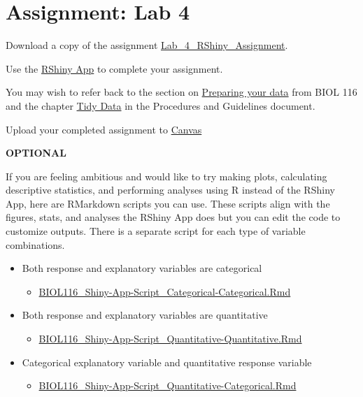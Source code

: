 \documentclass[
]{book}
\providecommand{\tightlist}{%
  \setlength{\itemsep}{0pt}\setlength{\parskip}{0pt}}
\begin{document}
\hypertarget{assignment-lab-4}{%
\chapter*{Assignment: Lab 4}\label{assignment-lab-4}}

Download a copy of the assignment \href{files/Lab_4_RShiny_Assignment.pdf}{Lab\_4\_RShiny\_Assignment}.

Use the \href{https://openscience.ok.ubc.ca/shiny/BIOL-116/}{RShiny App} to complete your assignment.

You may wish to refer back to the section on \href{https://ubco-biology.github.io/BIOL-116-Lab-Manual/preparing-your-data.html}{Preparing your data} from BIOL 116 and the chapter \href{https://ubco-biology.github.io/Procedures-and-Guidelines/tidy-data.html}{Tidy Data} in the Procedures and Guidelines document.

Upload your completed assignment to \href{https://canvas.ubc.ca/}{Canvas}

\textbf{OPTIONAL}

If you are feeling ambitious and would like to try making plots, calculating descriptive statistics, and performing analyses using R instead of the RShiny App, here are RMarkdown scripts you can use. These scripts align with the figures, stats, and analyses the RShiny App does but you can edit the code to customize outputs. There is a separate script for each type of variable combinations.

\begin{itemize}
\tightlist
\item
  Both response and explanatory variables are categorical

  \begin{itemize}
  \tightlist
  \item
    \href{files/BIOL116_Shiny-App-Script_Categorical-Categorical.Rmd}{BIOL116\_Shiny-App-Script\_Categorical-Categorical.Rmd}
  \end{itemize}
\item
  Both response and explanatory variables are quantitative

  \begin{itemize}
  \tightlist
  \item
    \href{files/BIOL116_Shiny-App-Script_Quantitative-Quantitative.Rmd}{BIOL116\_Shiny-App-Script\_Quantitative-Quantitative.Rmd}
  \end{itemize}
\item
  Categorical explanatory variable and quantitative response variable

  \begin{itemize}
  \tightlist
  \item
    \href{files/BIOL116_Shiny-App-Script_Quantitative-Categorical.Rmd}{BIOL116\_Shiny-App-Script\_Quantitative-Categorical.Rmd}
  \end{itemize}
\end{itemize}
\end{document}
